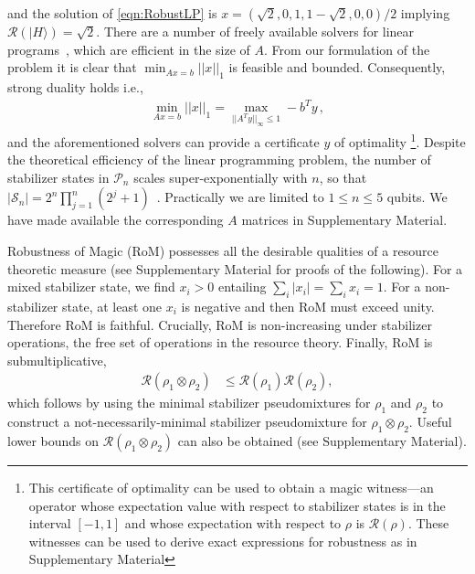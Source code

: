\documentclass[aps,prl,twocolumn,showpacs,superscriptaddress,groupedaddress,amsmath,amssymb]{revtex4-1}  %
\def\ket #1{\vert #1\rangle}
\begin{document}
and the solution of \eqref{eqn:RobustLP} is $x=\left(\sqrt{2},0,1,{1-\sqrt{2}},0,0\right)/2$ implying $\mathcal{R}(\ket{H})=\sqrt{2}$. There are a number of freely available solvers for linear programs~\cite{grant_graph_2008,grant_cvx:_2014}, which are efficient in the size of $A$. From our formulation of the problem  it is clear that $\min_{Ax=b} ||x||_1$ is feasible and  bounded.  Consequently, strong duality holds i.e.,
\begin{align}
\min_{Ax=b} ||x||_1 = \max_{||A^Ty||_\infty\leq 1} -b^Ty\,,  \label{eqn:duality}
\end{align}
and the aforementioned solvers can provide a certificate $y$ of optimality \footnote{This certificate of optimality can be used to obtain a magic witness---an operator whose expectation value with respect to stabilizer states is in the interval $[-1,1]$ and whose expectation with respect to $\rho$ is $\mathcal{R}(\rho)$. These witnesses can be used to derive exact expressions for robustness as in Supplementary Material}. Despite the theoretical efficiency of the linear programming problem, the number of stabilizer states in $\mathcal{P}_n$ scales super-exponentially with $n$, so that $|\mathcal{S}_n|=2^{n}\prod_{j=1}^n(2^j+1)$~\cite{gross_hudsons_2006}.  Practically we are limited to $1 \leq n \leq 5$ qubits. We have made available the corresponding $A$ matrices in Supplementary Material.

Robustness of Magic (RoM) possesses all the desirable qualities of a resource theoretic measure (see Supplementary Material for proofs of the following). For a mixed stabilizer state, we find $x_i>0$ entailing $ \sum_i | x_i | =  \sum_i  x_i =1  $.  For a non-stabilizer state, at least one $x_i$ is negative and then RoM must exceed unity. Therefore RoM is faithful. Crucially, RoM is non-increasing under stabilizer operations, the free set of operations in the resource theory. 
Finally, RoM is submultiplicative, \begin{align}
\mathcal{R}(\rho_1 \otimes \rho_2)&\leq\mathcal{R}(\rho_1)\mathcal{R}(\rho_2), \label{eqn:submult}
\end{align}
which follows by using the minimal stabilizer pseudomixtures for $\rho_1$ and $\rho_2$ to construct a not-necessarily-minimal stabilizer pseudomixture for $\rho_1 \otimes \rho_2$.  Useful lower bounds on $\mathcal{R}(\rho_1 \otimes \rho_2)$ can also be obtained (see Supplementary Material).  
\end{document}
